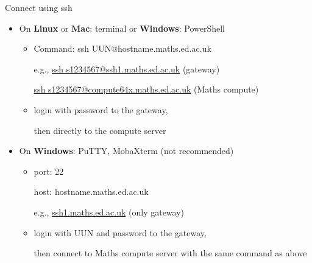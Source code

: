 \documentclass[10pt]{beamer}
\begin{document}
\begin{frame}[fragile]{Connect using ssh\footnotemark}

\begin{itemize}
    \item{
    On \textbf{Linux} or \textbf{Mac}: terminal or \textbf{Windows}: PowerShell
    \begin{itemize}
        \item {Command: ssh UUN@hostname.maths.ed.ac.uk
        
        e.g., \underline{ssh s1234567@ssh1.maths.ed.ac.uk} (gateway)
        
        \quad \quad \underline{ssh s1234567@compute64x.maths.ed.ac.uk} (Maths compute)
        }
        \item {login with password to the gateway, 
        
        then directly to the compute server}
    \end{itemize}
    }
    \hfill
    \item{
    On \textbf{Windows}: PuTTY, MobaXterm (not recommended)
    \begin{itemize}
        \item {port: 22
        
        host: hostname.maths.ed.ac.uk 
        
        e.g., \underline{ssh1.maths.ed.ac.uk} (only gateway)}
        \item {login with UUN and password to the gateway, 
        
        then connect to Maths compute server with the same command as above}
    \end{itemize}
    }
\end{itemize}


\end{frame}
\end{document}

